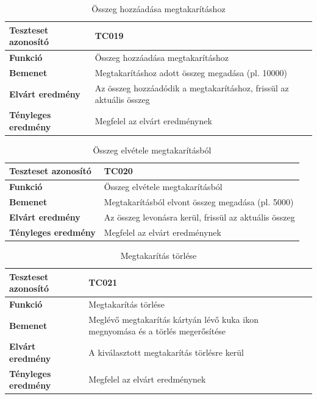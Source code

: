 \begin{table}[h!]
	\centering
	\begin{tabular}{|l|p{10cm}|}
		\hline
		\textbf{Teszteset azonosító} & TC019 \\ \hline
		\textbf{Funkció} & Összeg hozzáadása megtakarításhoz \\ \hline
		\textbf{Bemenet} & Megtakarításhoz adott összeg megadása (pl. 10000) \\ \hline
		\textbf{Elvárt eredmény} & Az összeg hozzáadódik a megtakarításhoz, frissül az aktuális összeg \\ \hline
		\textbf{Tényleges eredmény} & Megfelel az elvárt eredménynek \\ \hline
	\end{tabular}
	\caption{Összeg hozzáadása megtakarításhoz}
	\label{tab:hozzaadas_megtakaritashoz}
\end{table}

\begin{table}[h!]
	\centering
	\begin{tabular}{|l|p{10cm}|}
		\hline
		\textbf{Teszteset azonosító} & TC020 \\ \hline
		\textbf{Funkció} & Összeg elvétele megtakarításból \\ \hline
		\textbf{Bemenet} & Megtakarításból elvont összeg megadása (pl. 5000) \\ \hline
		\textbf{Elvárt eredmény} & Az összeg levonásra kerül, frissül az aktuális összeg \\ \hline
		\textbf{Tényleges eredmény} & Megfelel az elvárt eredménynek \\ \hline
	\end{tabular}
	\caption{Összeg elvétele megtakarításból}
	\label{tab:elvetel_megtakaritasbol}
\end{table}

\begin{table}[h!]
	\centering
	\begin{tabular}{|l|p{10cm}|}
		\hline
		\textbf{Teszteset azonosító} & TC021 \\ \hline
		\textbf{Funkció} & Megtakarítás törlése \\ \hline
		\textbf{Bemenet} & Meglévő megtakarítás kártyán lévő kuka ikon megnyomása és a törlés megerősítése \\ \hline
		\textbf{Elvárt eredmény} & A kiválasztott megtakarítás törlésre kerül \\ \hline
		\textbf{Tényleges eredmény} & Megfelel az elvárt eredménynek \\ \hline
	\end{tabular}
	\caption{Megtakarítás törlése}
	\label{tab:megtakaritas_torles}
\end{table}

